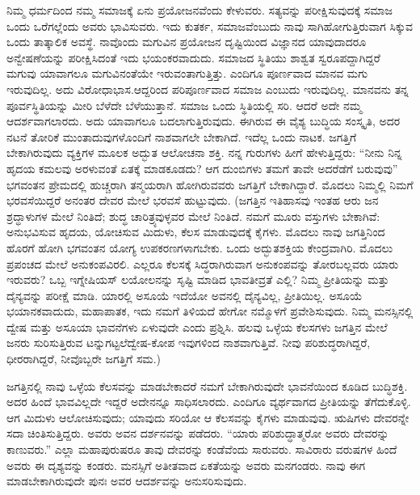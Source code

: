 \vskip 0.2cm

ನಿಮ್ಮ ಧರ್ಮದಿಂದ ನಮ್ಮ ಸಮಾಜಕ್ಕೆ ಏನು ಪ್ರಯೋಜನವೆಂದು ಕೇಳುವರು. ಸತ್ಯವನ್ನು ಪರೀಕ್ಷಿಸುವುದಕ್ಕೆ ಸಮಾಜ ಒಂದು ಒರೆಗಲ್ಲೆಂದು ಅವರು ಭಾವಿಸುವರು. ಇದು ಕುತರ್ಕ, ಸಮಾಜವೆಂಬುದು ನಾವು ಸಾಗಿಹೋಗುತ್ತಿರುವಾಗ ಸಿಕ್ಕುವ ಒಂದು ತಾತ್ಕಾಲಿಕ ಅವಸ್ಥೆ. ನಾವೊಂದು ಮಗುವಿನ ಪ್ರಯೋಜನ ದೃಷ್ಟಿಯಿಂದ ವಿಜ್ಞಾನದ ಯಾವುದಾದರೂ ಅನ್ವೇಷಣೆಯನ್ನು ಪರೀಕ್ಷಿಸಿದಂತೆ ಇದು ಭಯಂಕರವಾದುದು. ಸಮಾಜದ ಸ್ಥಿತಿಯು ಶಾಶ್ವತ ಸ್ವರೂಪದ್ದಾಗಿದ್ದರೆ ಮಗುವು ಯಾವಾಗಲೂ ಮಗುವಿನಂತೆಯೇ ಇರುವಂತಾಗುತ್ತಿತ್ತು. ಎಂದಿಗೂ ಪೂರ್ಣವಾದ ಮಾನವ ಮಗು ಇರುವುದಿಲ್ಲ. ಅದು ವಿರೋಧಾಭಾಸ.\break ಆದ್ದರಿಂದ ಪರಿಪೂರ್ಣವಾದ ಸಮಾಜ ಎಂಬುದು ಇರುವುದಿಲ್ಲ. ಮಾನವನು ತನ್ನ ಪೂರ್ವಸ್ಥಿತಿಯನ್ನು ಮೀರಿ ಬೆಳೆದೇ ಬೆಳೆಯುತ್ತಾನೆ. ಸಮಾಜ ಒಂದು ಸ್ಥಿತಿಯಲ್ಲಿ ಸರಿ. ಆದರೆ ಅದೇ ನಮ್ಮ ಆದರ್ಶವಾಗಲಾರದು. ಅದು ಯಾವಾಗಲೂ ಬದಲಾಗುತ್ತಿರುವುದು. ಈಗಿರುವ ಈ ವೈಶ್ಯ ಬುದ್ಧಿಯ ಸಂಸ್ಕೃತಿ, ಅದರ ನಟನೆ ತೋರಿಕೆ ಮುಂತಾದುವುಗಳೊಂದಿಗೆ ನಾಶವಾಗಲೇ ಬೇಕಾಗಿದೆ. ಇದೆಲ್ಲ ಒಂದು ನಾಟಕ. ಜಗತ್ತಿಗೆ ಬೇಕಾಗಿರುವುದು ವ್ಯಕ್ತಿಗಳ ಮೂಲಕ ಅದ್ಭುತ ಆಲೋಚನಾ ಶಕ್ತಿ. ನನ್ನ ಗುರುಗಳು ಹೀಗೆ ಹೇಳುತ್ತಿದ್ದರು: “ನೀನು ನಿನ್ನ ಹೃದಯ ಕಮಲವು ಅರಳುವಂತೆ ಏತಕ್ಕೆ ಮಾಡಕೂಡದು? ಆಗ ದುಂಬಿಗಳು ತಮಗೆ ತಾವೇ ಅದರೆಡೆಗೆ ಬರುವುವು” ಭಗವಂತನ ಪ್ರೇಮದಲ್ಲಿ ಹುಚ್ಚರಾಗಿ ತನ್ಮಯರಾಗಿ ಹೋಗಿರುವವರು ಜಗತ್ತಿಗೆ ಬೇಕಾಗಿದ್ದಾರೆ. ಮೊದಲು ನಿಮ್ಮಲ್ಲಿ ನಿಮಗೆ ಭರವಸೆಯಿದ್ದರೆ ಅನಂತರ ದೇವರ ಮೇಲೆ ಭರವಸೆ ಹುಟ್ಟುವುದು. (ಜಗತ್ತಿನ ಇತಿಹಾಸವು ಇಂತಹ ಆರು ಜನ ಶ್ರದ್ಧಾಳುಗಳ ಮೇಲೆ ನಿಂತಿದೆ; ಶುದ್ಧ ಚಾರಿತ್ರ್ಯವುಳ್ಳವರ ಮೇಲೆ ನಿಂತಿದೆ. ನಮಗೆ ಮೂರು ವಸ್ತುಗಳು ಬೇಕಾಗಿವೆ: ಅನುಭವಿಸುವ ಹೃದಯ, ಯೋಚಿಸುವ ಮಿದುಳು, ಕೆಲಸ ಮಾಡುವುದಕ್ಕೆ ಕೈಗಳು. ಮೊದಲು ನಾವು ಜಗತ್ತಿನಿಂದ ಹೊರಗೆ ಹೋಗಿ ಭಗವಂತನ ಯೋಗ್ಯ ಉಪಕರಣಗಳಾಗಬೇಕು. ಒಂದು ಅದ್ಭುತಶಕ್ತಿಯ ಕೇಂದ್ರವಾಗಿರಿ. ಮೊದಲು ಪ್ರಪಂಚದ ಮೇಲೆ ಅನುಕಂಪವಿರಲಿ. ಎಲ್ಲರೂ ಕೆಲಸಕ್ಕೆ ಸಿದ್ಧರಾಗಿರುವಾಗ ಅನುಕಂಪವನ್ನು ತೋರಬಲ್ಲವರು ಯಾರು ಇರುವರು? ಒಬ್ಬ ಇಗ್ನೇಷಿಯಸ್​ ಲಯೋಲನನ್ನು ಸೃಷ್ಟಿ ಮಾಡಿದ ಭಾವತೀವ್ರತೆ ಎಲ್ಲಿ? ನಿಮ್ಮ ಪ್ರೀತಿಯನ್ನು ಮತ್ತು ದೈನ್ಯವನ್ನು ಪರೀಕ್ಷೆ ಮಾಡಿ. ಯಾರಲ್ಲಿ ಅಸೂಯೆ ಇದೆಯೋ ಅವನಲ್ಲಿ ದೈನ್ಯವಿಲ್ಲ, ಪ್ರೀತಿಯಿಲ್ಲ. ಅಸೂಯೆ ಭಯಾನಕವಾದುದು, ಮಹಾಪಾತಕ, ಇದು ನಮಗೆ ತಿಳಿಯದೆ ಹೇಗೋ ನಮ್ಮೊಳಗೆ ಪ್ರವೇಶಿಸುವುದು. ನಿಮ್ಮ ಮನಸ್ಸಿನಲ್ಲಿ ದ್ವೇಷ ಮತ್ತು ಅಸೂಯಾ ಭಾವನೆಗಳು ಏಳುವುದೇ ಎಂದು ಪ್ರಶ್ನಿಸಿ. ಹಲವು ಒಳ್ಳೆಯ ಕೆಲಸಗಳು ಜಗತ್ತಿನ ಮೇಲೆ ಜನರು ಸುರಿಸುತ್ತಿರುವ ಟನ್ನುಗಟ್ಟಲೆ\break ದ್ವೇಷ-ಕೋಪ ಇವುಗಳಿಂದ ನಾಶವಾಗುತ್ತಿವೆ. ನೀವು ಪರಿಶುದ್ಧರಾಗಿದ್ದರೆ, ಧೀರರಾಗಿದ್ದರೆ, ನೀವೊಬ್ಬರೇ ಜಗತ್ತಿಗೆ ಸಮ.)

ಜಗತ್ತಿನಲ್ಲಿ ನಾವು ಒಳ್ಳೆಯ ಕೆಲಸವನ್ನು ಮಾಡಬೇಕಾದರೆ ನಮಗೆ ಬೇಕಾಗಿರುವುದೇ ಭಾವನೆಯಿಂದ ಕೂಡಿದ ಬುದ್ಧಿಶಕ್ತಿ. ಅದರ ಹಿಂದೆ ಭಾವವಿಲ್ಲದೇ ಇದ್ದರೆ ಅದೇನನ್ನೂ ಸಾಧಿಸಲಾರದು. ಎಂದಿಗೂ ವ್ಯರ್ಥವಾಗದ ಪ್ರೀತಿಯನ್ನು ತೆಗೆದುಕೊಳ್ಳಿ. ಆಗ ಮಿದುಳು ಆಲೋಚಿಸುವುದು; ಯಾವುದು ಸರಿಯೋ ಆ ಕೆಲಸವನ್ನು ಕೈಗಳು ಮಾಡುವುವು. ಋಷಿಗಳು ದೇವರನ್ನೇ ಸದಾ ಚಿಂತಿಸುತ್ತಿದ್ದರು. ಅವರು ಅವನ ದರ್ಶನವನ್ನು ಪಡೆದರು. “ಯಾರು ಪರಿಶುದ್ಧಾತ್ಮರೋ ಅವರು ದೇವರನ್ನು ಕಾಣುವರು.” ಎಲ್ಲಾ ಮಹಾಪುರುಷರೂ ತಾವು ದೇವರನ್ನು ಕಂಡೆವೆಂದು ಸಾರುವರು. ಸಾವಿರಾರು ವರುಷಗಳ ಹಿಂದೆ ಅವರು ಈ ದೃಶ್ಯವನ್ನು ಕಂಡರು. ಮನಸ್ಸಿಗೆ ಅತೀತವಾದ ಏಕತೆಯನ್ನು ಅವರು ಮನಗಂಡರು. ನಾವು ಈಗ ಮಾಡಬೇಕಾಗಿರುವುದೇ ಪುನಃ ಅವರ ಆದರ್ಶವನ್ನು ಅನುಸರಿಸುವುದು.

